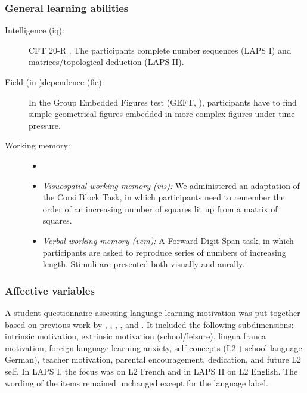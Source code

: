 \documentclass[output=paper]{langsci/langscibook}
\begin{document}
\subsubsection{General learning abilities}

\begin{description}
\item[Intelligence (iq):] CFT 20-R \citep{Weiss2006}. The participants complete number sequences (LAPS I) and matrices/topological deduction (LAPS II).

\item[Field (in-)dependence (fie):] In the Group Embedded Figures test (GEFT, \citealt{WitkinEtAl2014}), participants have to find simple geometrical figures embedded in more complex figures under time pressure.

\item[Working memory:]
\begin{itemize}
\item[]
\item \textit{Visuospatial working memory (vis):} We administered an adaptation of the Corsi Block Task, in which participants need to remember the order of an increasing number of squares lit up from a matrix of squares.
\item \textit{Verbal working memory (vem):} A Forward Digit Span task, in which participants are asked to reproduce series of numbers of increasing length. Stimuli are presented both visually and aurally.
\end{itemize}
\end{description}

\subsubsection{Affective variables}
\begin{sloppypar}
A student questionnaire assessing language learning motivation was put together based on previous work by \citet{HorwitzEtAl1986}, \citet{Stoeckli2004}, \citet{Doernyei2010}, \citet{Heinzmann2013}, and \citet{PeyerEtAl2016}. It included the following subdimensions: intrinsic motivation, extrinsic motivation (school/leisure), lingua franca motivation, foreign language learning anxiety, self-concepts (L2\,+\,school language German), teacher motivation, parental encouragement, dedication, and future L2 self. In LAPS I, the focus was on L2 French and in LAPS II on L2 English. The wording of the items remained unchanged except for the language label.
\end{sloppypar}
\end{document}
